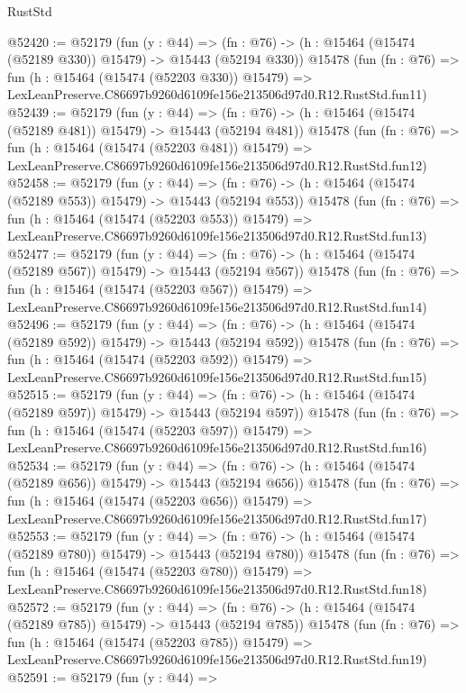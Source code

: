 \begin{lexlean}{RustStd}
\begin{coremodule}
@52420 := @52179
    (fun (y : @44) =>
    (fn : @76) -> (h : @15464 (@15474 (@52189 @330)) @15479) -> @15443 (@52194 @330))
    @15478
    (fun (fn : @76) =>
    fun (h : @15464 (@15474 (@52203 @330)) @15479) =>
    LexLeanPreserve.C86697b9260d6109fe156e213506d97d0.R12.RustStd.fun11)
@52439 := @52179
    (fun (y : @44) =>
    (fn : @76) -> (h : @15464 (@15474 (@52189 @481)) @15479) -> @15443 (@52194 @481))
    @15478
    (fun (fn : @76) =>
    fun (h : @15464 (@15474 (@52203 @481)) @15479) =>
    LexLeanPreserve.C86697b9260d6109fe156e213506d97d0.R12.RustStd.fun12)
@52458 := @52179
    (fun (y : @44) =>
    (fn : @76) -> (h : @15464 (@15474 (@52189 @553)) @15479) -> @15443 (@52194 @553))
    @15478
    (fun (fn : @76) =>
    fun (h : @15464 (@15474 (@52203 @553)) @15479) =>
    LexLeanPreserve.C86697b9260d6109fe156e213506d97d0.R12.RustStd.fun13)
@52477 := @52179
    (fun (y : @44) =>
    (fn : @76) -> (h : @15464 (@15474 (@52189 @567)) @15479) -> @15443 (@52194 @567))
    @15478
    (fun (fn : @76) =>
    fun (h : @15464 (@15474 (@52203 @567)) @15479) =>
    LexLeanPreserve.C86697b9260d6109fe156e213506d97d0.R12.RustStd.fun14)
@52496 := @52179
    (fun (y : @44) =>
    (fn : @76) -> (h : @15464 (@15474 (@52189 @592)) @15479) -> @15443 (@52194 @592))
    @15478
    (fun (fn : @76) =>
    fun (h : @15464 (@15474 (@52203 @592)) @15479) =>
    LexLeanPreserve.C86697b9260d6109fe156e213506d97d0.R12.RustStd.fun15)
@52515 := @52179
    (fun (y : @44) =>
    (fn : @76) -> (h : @15464 (@15474 (@52189 @597)) @15479) -> @15443 (@52194 @597))
    @15478
    (fun (fn : @76) =>
    fun (h : @15464 (@15474 (@52203 @597)) @15479) =>
    LexLeanPreserve.C86697b9260d6109fe156e213506d97d0.R12.RustStd.fun16)
@52534 := @52179
    (fun (y : @44) =>
    (fn : @76) -> (h : @15464 (@15474 (@52189 @656)) @15479) -> @15443 (@52194 @656))
    @15478
    (fun (fn : @76) =>
    fun (h : @15464 (@15474 (@52203 @656)) @15479) =>
    LexLeanPreserve.C86697b9260d6109fe156e213506d97d0.R12.RustStd.fun17)
@52553 := @52179
    (fun (y : @44) =>
    (fn : @76) -> (h : @15464 (@15474 (@52189 @780)) @15479) -> @15443 (@52194 @780))
    @15478
    (fun (fn : @76) =>
    fun (h : @15464 (@15474 (@52203 @780)) @15479) =>
    LexLeanPreserve.C86697b9260d6109fe156e213506d97d0.R12.RustStd.fun18)
@52572 := @52179
    (fun (y : @44) =>
    (fn : @76) -> (h : @15464 (@15474 (@52189 @785)) @15479) -> @15443 (@52194 @785))
    @15478
    (fun (fn : @76) =>
    fun (h : @15464 (@15474 (@52203 @785)) @15479) =>
    LexLeanPreserve.C86697b9260d6109fe156e213506d97d0.R12.RustStd.fun19)
@52591 := @52179
    (fun (y : @44) =>

\end{coremodule}
\end{lexlean}
